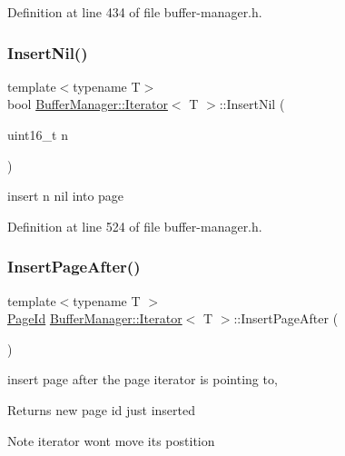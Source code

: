 Definition at line 434 of file buffer-\/manager.\+h.

\mbox{\label{class_buffer_manager_1_1_iterator_aee5637c96ddb7c5fef0f9a12d133c7c8}} 
\subsubsection{\texorpdfstring{InsertNil()}{InsertNil()}}
{\footnotesize\ttfamily template$<$typename T$>$ \\
bool \mbox{\hyperlink{class_buffer_manager_1_1_iterator}{Buffer\+Manager\+::\+Iterator}}$<$ T $>$\+::Insert\+Nil (\begin{DoxyParamCaption}\item[{uint16\+\_\+t}]{n }\end{DoxyParamCaption})\hspace{0.3cm}{\ttfamily [inline]}}

insert n nil into page 

Definition at line 524 of file buffer-\/manager.\+h.

\mbox{\label{class_buffer_manager_1_1_iterator_affb973bacb2deef1704e20221fb3c3fb}} 
\subsubsection{\texorpdfstring{InsertPageAfter()}{InsertPageAfter()}}
{\footnotesize\ttfamily template$<$typename T $>$ \\
\mbox{\hyperlink{struct_generic_i_o_id}{Page\+Id}} \mbox{\hyperlink{class_buffer_manager_1_1_iterator}{Buffer\+Manager\+::\+Iterator}}$<$ T $>$\+::Insert\+Page\+After (\begin{DoxyParamCaption}{ }\end{DoxyParamCaption})\hspace{0.3cm}{\ttfamily [inline]}}

insert page after the page iterator is pointing to, \begin{DoxyReturn}{Returns}
new page id just inserted 
\end{DoxyReturn}
\begin{DoxyNote}{Note}
iterator won\textquotesingle{}t move it\textquotesingle{}s postition 
\end{DoxyNote}


